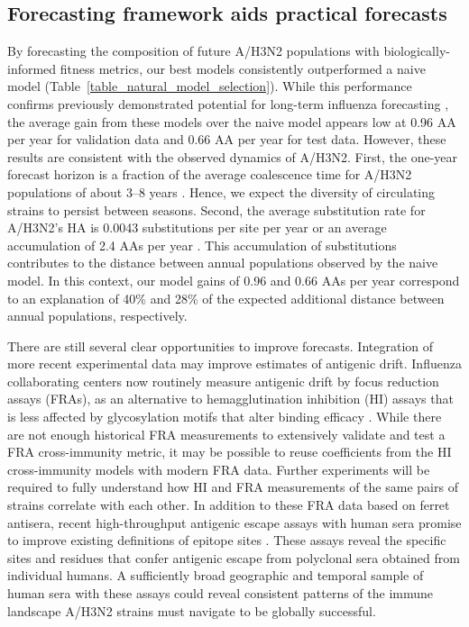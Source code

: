 \subsection*{Forecasting framework aids practical forecasts}

By forecasting the composition of future A/H3N2 populations with biologically-informed fitness metrics, our best models consistently outperformed a naive model (Table~\ref{table_natural_model_selection}).
While this performance confirms previously demonstrated potential for long-term influenza forecasting \cite{Luksza:2014hj}, the average gain from these models over the naive model appears low at 0.96 AA per year for validation data and 0.66 AA per year for test data.
However, these results are consistent with the observed dynamics of A/H3N2.
First, the one-year forecast horizon is a fraction of the average coalescence time for A/H3N2 populations of about 3--8 years \cite{Rambaut:2008ew}.
Hence, we expect the diversity of circulating strains to persist between seasons.
Second, the average substitution rate for A/H3N2's HA is 0.0043 substitutions per site per year or an average accumulation of 2.4 AAs per year \cite{}.
This accumulation of substitutions contributes to the distance between annual populations observed by the naive model.
In this context, our model gains of 0.96 and 0.66 AAs per year correspond to an explanation of 40\% and 28\% of the expected additional distance between annual populations, respectively.

There are still several clear opportunities to improve forecasts.
Integration of more recent experimental data may improve estimates of antigenic drift.
Influenza collaborating centers now routinely measure antigenic drift by focus reduction assays (FRAs), as an alternative to hemagglutination inhibition (HI) assays that is less affected by glycosylation motifs that alter binding efficacy \cite{Zost2017}.
While there are not enough historical FRA measurements to extensively validate and test a FRA cross-immunity metric, it may be possible to reuse coefficients from the HI cross-immunity models with modern FRA data.
Further experiments will be required to fully understand how HI and FRA measurements of the same pairs of strains correlate with each other.
In addition to these FRA data based on ferret antisera, recent high-throughput antigenic escape assays with human sera promise to improve existing definitions of epitope sites \cite{Lee2019}.
These assays reveal the specific sites and residues that confer antigenic escape from polyclonal sera obtained from individual humans.
A sufficiently broad geographic and temporal sample of human sera with these assays could reveal consistent patterns of the immune landscape A/H3N2 strains must navigate to be globally successful.

